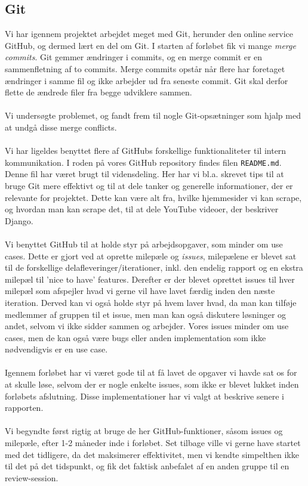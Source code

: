 \documentclass[12pt]{article}
\begin{document}
\subsection{Git}
\label{sec:git}
Vi har igennem projektet arbejdet meget med Git, herunder den online service GitHub, og dermed lært en del om Git. I starten af forløbet fik vi mange \textit{merge commits}. Git gemmer ændringer i commits, og en merge commit er en sammenfletning af to commits. Merge commits opstår når flere har foretaget ændringer i samme fil og ikke arbejder ud fra seneste commit. Git skal derfor flette de ændrede filer fra begge udviklere sammen.\\
\\
Vi undersøgte problemet, og fandt frem til nogle Git-opsætninger som hjalp med at undgå disse merge conflicts.\cite{mergecommits}\\
\\
Vi har ligeldes benyttet flere af GitHubs forskellige funktionaliteter til intern kommunikation. I roden på vores GitHub repository findes filen \texttt{README.md}. Denne fil har været brugt til vidensdeling.
Her har vi bl.a. skrevet tips til at bruge Git mere effektivt og til at dele tanker og generelle informationer, der er relevante for projektet. Dette kan være alt fra, hvilke hjemmesider vi kan scrape, og hvordan man kan scrape det, til at dele YouTube videoer, der beskriver Django. \\ \\
Vi benyttet GitHub til at holde styr på arbejdsopgaver, som minder om use cases. Dette er gjort ved at oprette milepæle og \textit{issues}, milepælene er blevet sat til de forskellige delafleveringer/iterationer, inkl. den endelig rapport og en ekstra milepæl til 'nice to have' features. Derefter er der blevet oprettet issues til hver milepæl som afspejler hvad vi gerne vil have lavet færdig inden den næste iteration. Derved kan vi også holde styr på hvem laver hvad, da man kan tilføje medlemmer af gruppen til et issue, men man kan også diskutere løsninger og andet, selvom vi ikke sidder sammen og arbejder.
Vores issues minder om use cases, men de kan også være bugs eller anden implementation som ikke nødvendigvis er en use case. \\
\\
Igennem forløbet har vi været gode til at få lavet de opgaver vi havde sat os for at skulle løse, selvom der er nogle enkelte issues, som ikke er blevet lukket inden forløbets afslutning. Disse implementationer har vi valgt at beskrive senere i rapporten. \\ \\
Vi begyndte først rigtig at bruge de her GitHub-funktioner, såsom issues og milepæle, efter 1-2 måneder inde i forløbet. Set tilbage ville vi gerne have startet med det tidligere, da det maksimerer effektivitet, men vi kendte simpelthen ikke til det på det tidspunkt, og fik det faktisk anbefalet af en anden gruppe til en review-session. %
\end{document}
